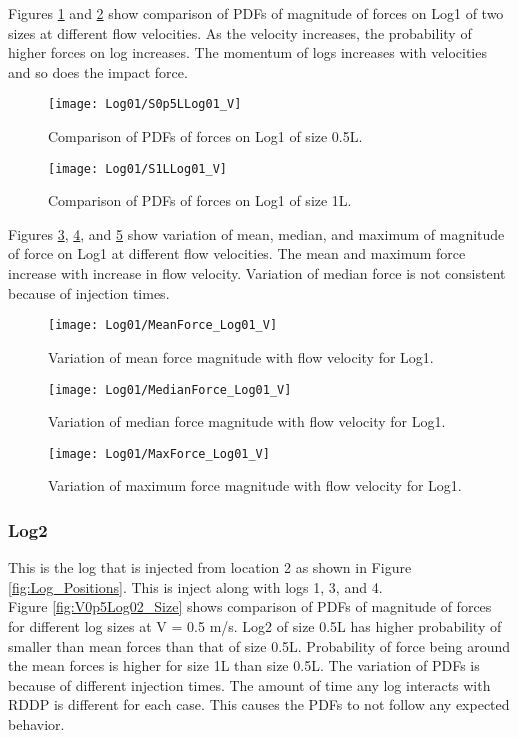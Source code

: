 \noindent Figures \ref{fig:S0p5LLog01_V} and \ref{fig:S1LLog01_V} show comparison of PDFs of magnitude of forces on Log1 of two sizes at different flow velocities. As the velocity increases, the probability of higher forces on log increases. The momentum of logs increases with velocities and so does the impact force.

\begin{figure}
\centering
\texttt{[image: Log01/S0p5LLog01\_V]}
\caption{\label{fig:S0p5LLog01_V}Comparison of PDFs of forces on Log1 of size 0.5L.}
\end{figure}
\begin{figure}
\centering
\texttt{[image: Log01/S1LLog01\_V]}
\caption{\label{fig:S1LLog01_V}Comparison of PDFs of forces on Log1 of size 1L.}
\end{figure}

\noindent Figures \ref{fig:MeanForce_Log01_V}, \ref{fig:MedianForce_Log01_V}, and \ref{fig:MaxForce_Log01_V} show variation of mean, median, and maximum of magnitude of force on Log1 at different flow velocities. The mean and maximum force increase with increase in flow velocity. Variation of median force is not consistent because of injection times.

\begin{figure}
\centering
\texttt{[image: Log01/MeanForce\_Log01\_V]}
\caption{\label{fig:MeanForce_Log01_V}Variation of mean force magnitude with flow velocity for Log1.}
\end{figure}
\begin{figure}
\centering
\texttt{[image: Log01/MedianForce\_Log01\_V]}
\caption{\label{fig:MedianForce_Log01_V}Variation of median force magnitude with flow velocity for Log1.}
\end{figure}
\begin{figure}
\centering
\texttt{[image: Log01/MaxForce\_Log01\_V]}
\caption{\label{fig:MaxForce_Log01_V}Variation of maximum force magnitude with flow velocity for Log1.}
\end{figure}

\FloatBarrier
\subsubsection{Log2}
This is the log that is injected from location 2 as shown in Figure \ref{fig:Log_Positions}. This is inject along with logs 1, 3, and 4.\\ 
Figure \ref{fig:V0p5Log02_Size} shows comparison of PDFs of magnitude of forces for different log sizes at V = 0.5 m/s. Log2 of size 0.5L has higher probability of smaller  than mean forces than that of size 0.5L.  Probability of force being around the mean forces is higher for size 1L than size 0.5L. The variation of PDFs is because of different injection times. The amount of time any log interacts with RDDP is different for each case. This causes the PDFs to not follow any expected behavior.

